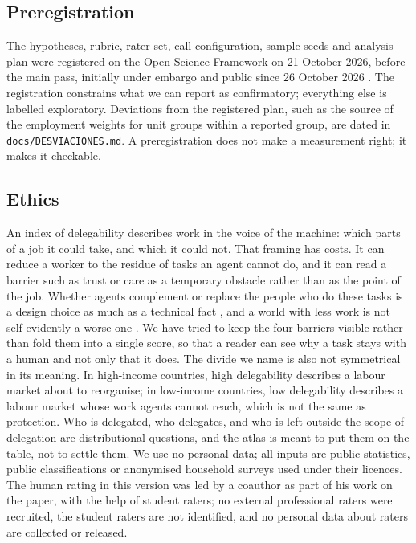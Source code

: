 \subsection{Preregistration}

The hypotheses, rubric, rater set, call configuration, sample seeds and analysis plan were registered on the Open Science Framework on 21 October 2026, before the main pass, initially under embargo and public since 26 October 2026 \prerregcita.
The registration constrains what we can report as confirmatory; everything else is labelled exploratory.
Deviations from the registered plan, such as the source of the employment weights for unit groups within a reported group, are dated in \texttt{docs/DESVIACIONES.md}.
A preregistration does not make a measurement right; it makes it checkable.

\subsection{Ethics}

An index of delegability describes work in the voice of the machine: which parts of a job it could take, and which it could not.
That framing has costs.
It can reduce a worker to the residue of tasks an agent cannot do, and it can read a barrier such as trust or care as a temporary obstacle rather than as the point of the job.
Whether agents complement or replace the people who do these tasks is a design choice as much as a technical fact \citep{autor2024applying}, and a world with less work is not self-evidently a worse one \citep{danaher2019automation}.
We have tried to keep the four barriers visible rather than fold them into a single score, so that a reader can see why a task stays with a human and not only that it does.
The divide we name is also not symmetrical in its meaning.
In high-income countries, high delegability describes a labour market about to reorganise; in low-income countries, low delegability describes a labour market whose work agents cannot reach, which is not the same as protection.
Who is delegated, who delegates, and who is left outside the scope of delegation are distributional questions, and the atlas is meant to put them on the table, not to settle them.
We use no personal data; all inputs are public statistics, public classifications or anonymised household surveys used under their licences.
The human rating in this version was led by a coauthor as part of his work on the paper, with the help of student raters; no external professional raters were recruited, the student raters are not identified, and no personal data about raters are collected or released.
